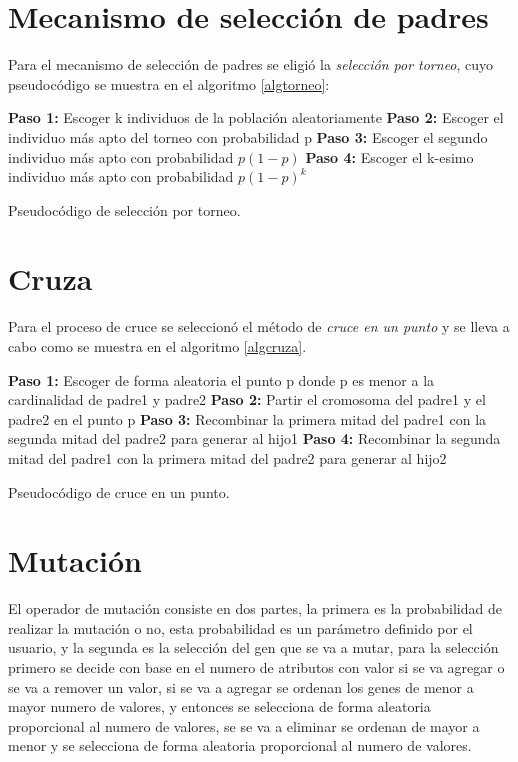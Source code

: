 \section{Mecanismo de selección de padres}

Para el mecanismo de selección de padres se eligió la \emph{selección por torneo}, cuyo pseudocódigo se muestra en el algoritmo \ref{algtorneo}:

\begin{algorithm}[H] 
	\SetAlgoLined
	\textbf{Paso 1:} Escoger k individuos de la población aleatoriamente\;
	\textbf{Paso 2:} Escoger el individuo más apto del torneo con probabilidad p\;
	\textbf{Paso 3:} Escoger el segundo individuo más apto con probabilidad $p(1-p)$\;
	\textbf{Paso 4:} Escoger el k-esimo individuo más apto con probabilidad $p(1-p)^k$\;
	\caption{Pseudocódigo de selección por torneo.} \label{algtorneo}
\end{algorithm}

\section{Cruza}

Para el proceso de cruce se seleccionó el método de \emph{cruce en un punto} y se lleva a cabo como se muestra en el algoritmo \ref{algcruza}.
\\
\begin{algorithm}[H] 
	\SetAlgoLined
	\textbf{Paso 1:} Escoger de forma aleatoria el punto p donde p es menor a la cardinalidad de padre1 y padre2\;
	\textbf{Paso 2:} Partir el cromosoma del padre1 y el padre2 en el punto p\;
	\textbf{Paso 3:} Recombinar la primera mitad del padre1 con la segunda mitad del padre2 para generar al hijo1\;
	\textbf{Paso 4:} Recombinar la segunda mitad del padre1 con la primera mitad del padre2 para generar al hijo2\;
	\caption{Pseudocódigo de cruce en un punto.} \label{algcruza}
\end{algorithm}


\section{Mutación}

El operador de mutación consiste en dos partes, la primera es la probabilidad de realizar la mutación o no, esta probabilidad es un parámetro definido por el usuario, y la segunda es la selección del gen que se va a mutar, para la selección primero se decide con base en el numero de atributos con valor si se va agregar o se va a remover un valor, si se va a agregar se ordenan los genes de menor a mayor numero de valores, y entonces se selecciona de forma aleatoria proporcional al numero de valores, se se va a eliminar se ordenan de mayor a menor y se selecciona de forma aleatoria proporcional al numero de valores.
\\

